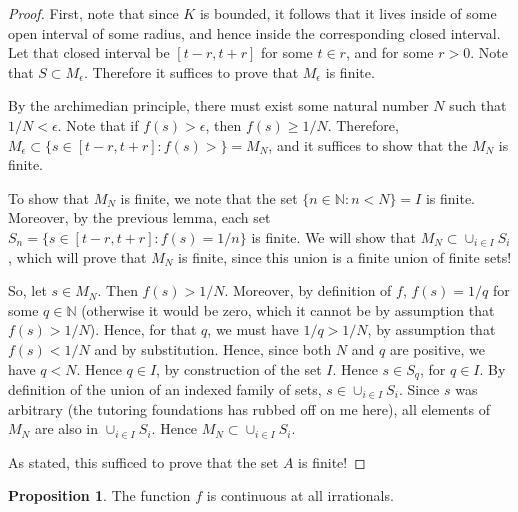 \documentclass[12pt]{article}
\newcommand{\N}{\mathbb{N}}
\theoremstyle{definition}
\newtheorem{proposition}{Proposition}
\begin{document}
\begin{proof}
    First, note that since $K$ is bounded, it follows that it lives inside of some open interval of some radius, and hence inside the corresponding closed interval. Let that closed interval be $ [t - r, t + r] $ for some $t\in r$, and for some $r> 0$. Note that $ S\subset M_\epsilon $. Therefore it suffices to prove that $M_\epsilon$ is finite. 

    By the archimedian principle, there must exist some natural number $N$ such that $1/N < \epsilon$. Note that if $ f(s) > \epsilon $, then $ f(s) \ge 1/N $. Therefore, $M_\epsilon\subset \{s\in [t - r, t + r]: f(s) > \} = M_N$, and it suffices to show that the $M_N$ is finite. 

    To show that $M_N$ is finite, we note that the set $ \{n\in \N: n < N\} = I$ is finite. Moreover, by the previous lemma, each set $S_n = \{s\in [t - r, t + r]: f(s) = 1/n\}$ is finite. We will show that $ M_N \subset \cup_{i\in I}S_i $, which will prove that $M_N$ is finite, since this union is a finite union of finite sets!

    So, let $s\in M_N$. Then $ f(s) > 1/N $. Moreover, by definition of $f$, $f(s) = 1/q$ for some $q\in \N$ (otherwise it would be zero, which it cannot be by assumption that $f(s) > 1/N$). Hence, for that $q$, we must have $ 1/q > 1/N$, by assumption that $ f(s) < 1/N $ and by substitution. Hence, since both $N$ and $q$ are positive, we have $ q < N $. Hence $ q\in I $, by construction of the set $I$. Hence $s\in S_q$, for $q\in I$. By definition of the union of an indexed family of sets, $ s\in \cup_{i\in I}S_i $. Since $s$ was arbitrary (the tutoring foundations has rubbed off on me here), all elements of $M_N$ are also in $\cup_{i\in I}S_i$. Hence $M_N \subset \cup_{i\in I}S_i$. 
    
    As stated, this sufficed to prove that the set $A$ is finite! 

\end{proof}

\begin{proposition}
    The function $f$ is continuous at all irrationals. 
\end{proposition}
\end{document}
